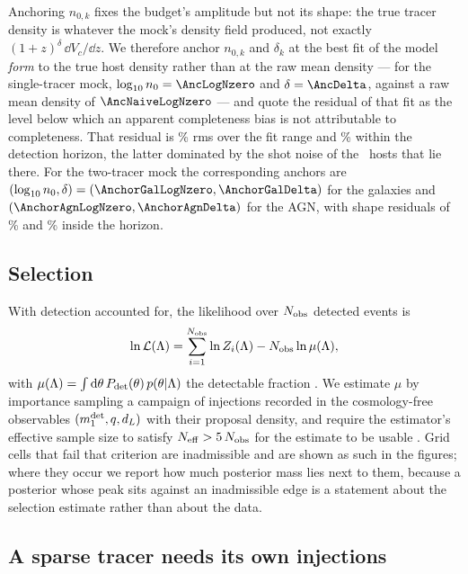 Anchoring $n_{0,k}$ fixes the budget's amplitude but not its shape: the true
tracer density is whatever the mock's density field produced, not exactly
$(1+z)^{\delta}\,\dd V_c/\dd z$. We therefore anchor $n_{0,k}$ and $\delta_k$ at
the best fit of the model \emph{form} to the true host density rather than at
the raw mean density --- for the single-tracer mock,
$\log_{10} n_0 = \AncLogNzero$ and $\delta = \AncDelta$, against a raw mean
density of $\AncNaiveLogNzero$ --- and quote the residual of that fit as the
level below which an apparent completeness bias is not attributable to
completeness. That residual is \AncResidFit\% rms over the fit range and
\AncResidHorizon\% within the detection horizon, the latter dominated by the
shot noise of the \AncNHostsInHorizon\ hosts that lie there. For the two-tracer
mock the corresponding anchors are
$(\log_{10} n_0, \delta) = (\AnchorGalLogNzero, \AnchorGalDelta)$ for the
galaxies and $(\AnchorAgnLogNzero, \AnchorAgnDelta)$ for the AGN, with shape
residuals of \AnchorGalResidHorizon\% and \AnchorAgnResidHorizon\% inside the
horizon.

\subsection{Selection}
\label{sec:methods:selection}

With detection accounted for, the likelihood over $N_{\rm obs}$ detected events is
\begin{equation}
  \ln \mathcal{L}(\Lambda) = \sum_{i=1}^{N_{\rm obs}} \ln Z_i(\Lambda)
      - N_{\rm obs} \ln \mu(\Lambda),
  \label{eq:like}
\end{equation}
with $\mu(\Lambda) = \int \mathrm{d}\theta\, P_{\rm det}(\theta)\, p(\theta|\Lambda)$
the detectable fraction \citep{MandelFarrGair2019}. We estimate $\mu$ by
importance sampling a campaign of injections recorded in the cosmology-free
observables $(m_1^{\rm det}, q, d_L)$ with their proposal density, and require
the estimator's effective sample size to satisfy $N_{\rm eff} > 5\,N_{\rm obs}$ for the
estimate to be usable \citep{Farr2019, Vitale2022}. Grid cells that fail
that criterion are inadmissible and are shown as such in the figures; where
they occur we report how much posterior mass lies next to them, because a
posterior whose peak sits against an inadmissible edge is a statement about the
selection estimate rather than about the data.

\subsection{A sparse tracer needs its own injections}
\label{sec:methods:targeted}

